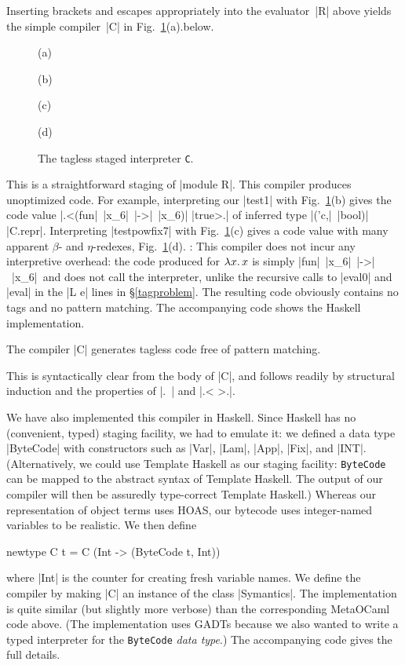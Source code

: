 Inserting brackets and escapes appropriately into the
evaluator~|R| above yields the simple compiler~|C|
\ifshort in Fig.~\ref{fig:interpreter-C}(a).\else below.
\fi
\ifshort
\begin{figure}[t]
(a) 

(b) 

(c) 

(d) 
\caption{The tagless staged interpreter \texttt{C}.}
\label{fig:interpreter-C}
\end{figure}
\fi
This is a straightforward staging of
|module R|.
This compiler produces
unoptimized code. For example, interpreting our |test1| with
\ifshort Fig.~\ref{fig:interpreter-C}(b) \else {}\fi
gives the code value |.<(fun|~|x_6|~|->|~|x_6)| |true>.|
of inferred type |('c,|~|bool)| |C.repr|.  Interpreting |testpowfix7|
\ifshort\pagebreak[3]\fi
with
\ifshort Fig.~\ref{fig:interpreter-C}(c) \else {}\fi
gives a code value with many apparent $\beta$- and $\eta$-redexes\ifshort,
Fig.~\ref{fig:interpreter-C}(d). \else: \fi
This compiler does not incur
any interpretive overhead: the
code produced for $\mathopen{\lambda\mathord{x}.\,}x$ is simply |fun|~|x_6|~|->|~|x_6|\ifshort\else\
and does not
call the interpreter, unlike the recursive calls to |eval0| and
|eval| in the |L e| lines in \S\ref{tagproblem}\fi.
The resulting code obviously contains no tags and no pattern matching.
\ifshort
The accompanying code shows the Haskell implementation. 
\else
\begin{proposition}
    The compiler |C| generates tagless code free of pattern matching.
\end{proposition}
This is syntactically clear from the body of |C|, and follows
readily by structural induction and the properties of |.~| and
|.< >.|.

We have also implemented this compiler in Haskell. 
Since Haskell
has no (convenient, typed) staging facility, we had to emulate
it: we defined a data type |ByteCode| with
constructors such as |Var|, |Lam|, |App|, |Fix|, and |INT|.
(Alternatively, we could use Template Haskell as our staging facility:
\texttt{ByteCode} can be mapped to the abstract syntax of Template
Haskell. The output of our compiler will then be assuredly type-correct
Template Haskell.)
Whereas our representation of object terms uses HOAS,
our bytecode uses integer-named
variables to be realistic. 
We then define 
\begin{code}
newtype C t = C (Int -> (ByteCode t, Int)) 
\end{code}
where |Int| is the counter for creating fresh variable
names. We define the compiler by making |C| an instance of the
class |Symantics|.
The implementation is quite similar (but slightly more
verbose) than the corresponding MetaOCaml code above. (The implementation uses
GADTs because we also wanted to write a typed interpreter for 
the \texttt{ByteCode} \emph{data type}.) The
accompanying code gives the full details.
\fi

